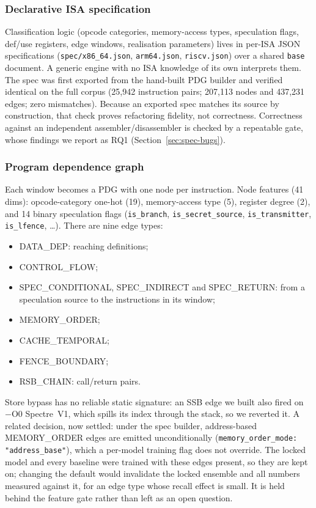 \documentclass[conference]{IEEEtran}
\begin{document}
\subsubsection{Declarative ISA specification}
Classification logic (opcode categories, memory-access types, speculation
flags, def/use registers, edge windows, realisation parameters) lives in
per-ISA JSON specifications (\texttt{spec/x86\_64.json},
\texttt{arm64.json}, \texttt{riscv.json}) over a shared \texttt{base}
document. A generic engine with no ISA knowledge of its own interprets them.
The spec was first exported from the hand-built PDG builder and verified
identical on the full corpus (25,942 instruction pairs; 207,113 nodes and
437,231 edges; zero mismatches). Because an exported spec matches its source by
construction, that check proves refactoring fidelity, not correctness.
Correctness against an independent assembler/disassembler is checked by a
repeatable gate, whose findings we report as RQ1 (Section~\ref{sec:spec-bugs}).

\subsubsection{Program dependence graph}
\label{sec:pdg}
Each window becomes a PDG with one node per instruction. Node features
(41 dims): opcode-category one-hot (19), memory-access type (5), register
degree (2), and 14 binary speculation flags (\texttt{is\_branch},
\texttt{is\_secret\_source}, \texttt{is\_transmitter}, \texttt{is\_lfence},
\ldots). There are nine edge types:
\begin{itemize}[itemsep=0pt,leftmargin=1.2em]
  \item DATA\_DEP: reaching definitions;
  \item CONTROL\_FLOW;
  \item SPEC\_CONDITIONAL, SPEC\_INDIRECT and SPEC\_RETURN: from a
    speculation source to the instructions in its window;
  \item MEMORY\_ORDER;
  \item CACHE\_TEMPORAL;
  \item FENCE\_BOUNDARY;
  \item RSB\_CHAIN: call/return pairs.
\end{itemize}
Store bypass has no reliable static signature: an SSB edge we built also fired
on $-$O0 Spectre~V1, which spills its index through the stack, so we
reverted it. A related decision, now settled: under the spec builder,
address-based MEMORY\_ORDER edges are emitted unconditionally
(\texttt{memory\_order\_mode: "address\_base"}), which a per-model training flag
does not override. The locked model and every baseline were trained with these
edges present, so they are kept on; changing the default would invalidate the
locked ensemble and all numbers measured against it, for an edge type whose
recall effect is small. It is held behind the feature gate rather than left as
an open question.
\end{document}
